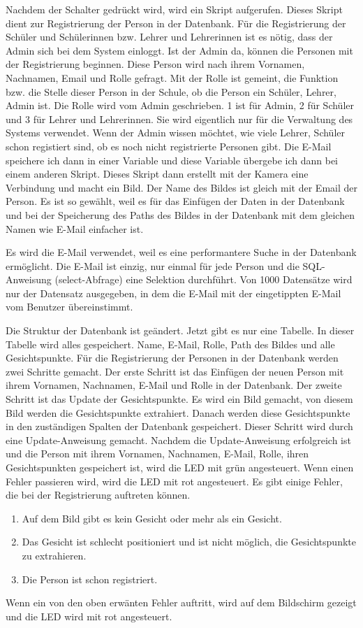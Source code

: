 \begin{enumerate}
Nachdem der Schalter gedr\"uckt wird, wird ein Skript aufgerufen. Dieses Skript dient zur Registrierung der Person in der Datenbank.
F\"ur die Registrierung der Sch\"uler und Sch\"ulerinnen bzw. Lehrer und Lehrerinnen ist es n\"otig, dass der Admin sich bei dem System einloggt. Ist der Admin da, k\"onnen die Personen mit der Registrierung beginnen.
Diese Person wird nach ihrem Vornamen, Nachnamen, Email und Rolle gefragt. Mit der Rolle ist gemeint, die Funktion bzw. die Stelle dieser Person in der Schule, ob die Person ein Sch\"uler, Lehrer, Admin ist. Die Rolle wird vom Admin geschrieben. 1 ist f\"ur Admin, 2 f\"ur Sch\"uler und 3 f\"ur Lehrer und Lehrerinnen. Sie wird eigentlich nur f\"ur die Verwaltung des Systems verwendet. Wenn der Admin wissen m\"ochtet, wie viele Lehrer, Sch\"uler schon registiert sind, ob es noch nicht registrierte Personen gibt. 
Die E-Mail speichere ich dann in einer Variable und diese Variable \"ubergebe ich dann bei einem anderen Skript. Dieses Skript dann erstellt mit der Kamera eine Verbindung und macht ein Bild. Der Name des Bildes ist gleich mit der Email der Person. Es ist so gew\"ahlt, weil es f\"ur das Einf\"ugen der Daten in der Datenbank und bei der Speicherung des Paths des Bildes in der Datenbank mit dem gleichen Namen wie E-Mail einfacher ist.

Es wird die E-Mail verwendet, weil es eine performantere Suche in der Datenbank erm\"oglicht. Die E-Mail ist einzig, nur einmal f\"ur jede Person und die SQL-Anweisung (select-Abfrage) eine Selektion durchf\"uhrt. Von 1000 Datens\"atze wird nur der Datensatz ausgegeben, in dem die E-Mail mit der eingetippten E-Mail vom Benutzer \"ubereinstimmt.

Die Struktur der Datenbank ist ge\"andert. Jetzt gibt es nur eine Tabelle. In dieser Tabelle wird alles gespeichert. Name, E-Mail, Rolle, Path des Bildes und alle Gesichtspunkte. Für die Registrierung der Personen in der Datenbank werden zwei Schritte gemacht. Der erste Schritt ist das Einfügen der neuen Person mit ihrem Vornamen, Nachnamen, E-Mail und Rolle in der Datenbank. Der zweite Schritt ist das Update der Gesichtspunkte. Es wird ein Bild gemacht, von diesem Bild werden die Gesichtspunkte extrahiert. Danach werden diese Gesichtspunkte in den zuständigen Spalten der Datenbank gespeichert. Dieser Schritt wird durch eine Update-Anweisung gemacht. Nachdem die Update-Anweisung erfolgreich ist und die Person mit ihrem Vornamen, Nachnamen, E-Mail, Rolle, ihren Gesichtspunkten gespeichert ist, wird die LED mit grün angesteuert. Wenn einen Fehler passieren wird, wird die LED mit rot angesteuert. Es gibt einige Fehler, die bei der Registrierung auftreten können. 
\begin{enumerate}
	\item Auf dem Bild gibt es kein Gesicht oder mehr als ein Gesicht.
	\item Das Gesicht ist schlecht positioniert und ist nicht m\"oglich, die Gesichtspunkte zu extrahieren.
	\item Die Person ist schon registriert.
\end{enumerate}
Wenn ein von den oben erw\"anten Fehler auftritt, wird auf dem Bildschirm gezeigt und die LED wird mit rot angesteuert.
\end{enumerate}

